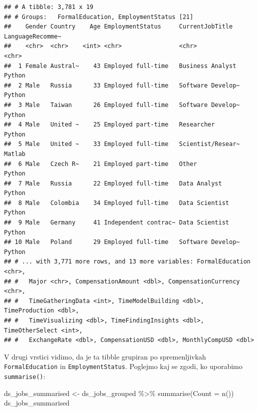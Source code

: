 \documentclass[
]{book}
\newenvironment{Shaded}{\begin{snugshade}}{\end{snugshade}}
\newcommand{\AttributeTok}[1]{\textcolor[rgb]{0.77,0.63,0.00}{#1}}
\newcommand{\FunctionTok}[1]{\textcolor[rgb]{0.00,0.00,0.00}{#1}}
\newcommand{\NormalTok}[1]{#1}
\newcommand{\OtherTok}[1]{\textcolor[rgb]{0.56,0.35,0.01}{#1}}
\newcommand{\SpecialCharTok}[1]{\textcolor[rgb]{0.00,0.00,0.00}{#1}}
\begin{document}
\begin{verbatim}
## # A tibble: 3,781 x 19
## # Groups:   FormalEducation, EmploymentStatus [21]
##    Gender Country    Age EmploymentStatus     CurrentJobTitle   LanguageRecomme~
##    <chr>  <chr>    <int> <chr>                <chr>             <chr>           
##  1 Female Austral~    43 Employed full-time   Business Analyst  Python          
##  2 Male   Russia      33 Employed full-time   Software Develop~ Python          
##  3 Male   Taiwan      26 Employed full-time   Software Develop~ Python          
##  4 Male   United ~    25 Employed part-time   Researcher        Python          
##  5 Male   United ~    33 Employed full-time   Scientist/Resear~ Matlab          
##  6 Male   Czech R~    21 Employed part-time   Other             Python          
##  7 Male   Russia      22 Employed full-time   Data Analyst      Python          
##  8 Male   Colombia    34 Employed full-time   Data Scientist    Python          
##  9 Male   Germany     41 Independent contrac~ Data Scientist    Python          
## 10 Male   Poland      29 Employed full-time   Software Develop~ Python          
## # ... with 3,771 more rows, and 13 more variables: FormalEducation <chr>,
## #   Major <chr>, CompensationAmount <dbl>, CompensationCurrency <chr>,
## #   TimeGatheringData <int>, TimeModelBuilding <dbl>, TimeProduction <dbl>,
## #   TimeVisualizing <dbl>, TimeFindingInsights <dbl>, TimeOtherSelect <int>,
## #   ExchangeRate <dbl>, CompensationUSD <dbl>, MonthlyCompUSD <dbl>
\end{verbatim}

V drugi vrstici vidimo, da je ta tibble grupiran po spremenljivkah \texttt{FormalEducation} in \texttt{EmploymentStatus}. Poglejmo kaj se zgodi, ko uporabimo \texttt{summarise()}:

\begin{Shaded}
\begin{Highlighting}[]
\NormalTok{ds\_jobs\_summarised }\OtherTok{\textless{}{-}}\NormalTok{ ds\_jobs\_grouped }\SpecialCharTok{\%\textgreater{}\%}
  \FunctionTok{summarise}\NormalTok{(}\AttributeTok{Count =} \FunctionTok{n}\NormalTok{())}
\NormalTok{ds\_jobs\_summarised}
\end{Highlighting}
\end{Shaded}
\end{document}
